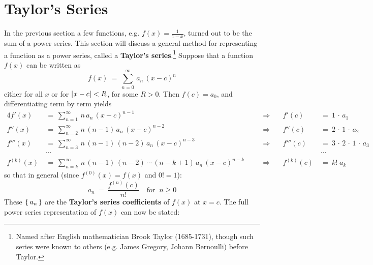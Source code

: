 \section{Taylor's Series}
In the previous section a few functions, e.g. $f(x) = \frac{1}{1-x}$, turned out
to be the sum of a power series. This section will discuss a general method for
representing a function as a power series, called a
\textbf{Taylor's series}.\footnote{Named after English mathematician Brook
Taylor (1685-1731), though such series were known to others (e.g. James Gregory,
Johann Bernoulli) before Taylor.} Suppose that a function $f(x)$ can be written
as
\[
f(x) ~=~ \sum_{n=0}^{\infty}\,a_n\,(x-c)^n
\]
either for all $x$ or for $\lvert\mspace{1mu}x-c\mspace{1mu}\rvert < R$, for some $R>0$. Then $f(c) = a_0$,
and differentiating term by term yields
\begin{alignat*}{4}
f'(x) ~&=~ \sum_{n=1}^{\infty}\,n\,a_n\,(x-c)^{n-1} &&\Rightarrow \quad
           &f'(c) ~&=~ 1\,\cdot\,a_1\\[2pt]
f''(x) ~&=~ \sum_{n=2}^{\infty}\,n\,(n-1)\,a_n\,(x-c)^{n-2} &&\Rightarrow \quad
           &f''(c) ~&=~ 2\,\cdot\,1\,\cdot\,a_2\\[2pt]
f'''(x) ~&=~ \sum_{n=3}^{\infty}\,n\,(n-1)\,(n-2)\,a_n\,(x-c)^{n-3} &&\Rightarrow \quad
           &f'''(c) ~&=~ 3\,\cdot\,2\,\cdot\,1\,\cdot\,a_3\\
&\cdots & {} & {} & {} &\cdots\\
f^{(k)}(x) ~&=~ \sum_{n=k}^{\infty}\,n\,(n-1)\,(n-2)\,\cdots\,(n-k+1)\,a_n\,(x-c)^{n-k}
\quad &&\Rightarrow \quad &f^{(k)}(c) ~&=~ k !\;a_k
\end{alignat*}
so that in general (since $f^{(0)}(x) = f(x)$ and $0 ! = 1$):
\begin{equation}\label{eqn:taylorcoeff}
a_n ~=~ \frac{f^{(n)}(c)}{n !} \quad\text{for $~n \ge 0$}
\end{equation}
These $\left\lbrace\mspace{3mu}a_n\mspace{3mu}\right\rbrace$ are the \textbf{Taylor's series coefficients} of $f(x)$ at
$x=c$. The full power series representation of $f(x)$ can now be stated:

